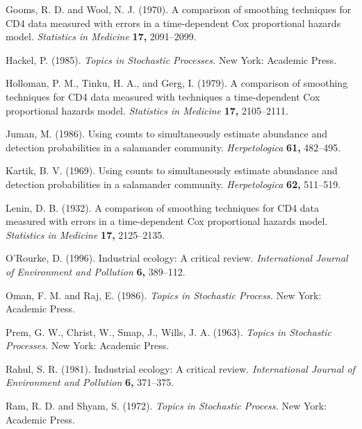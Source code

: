 \documentclass[useAMS,usenatbib]{biom}
\begin{document}
\begin{thebibliography}{}
 Gooms,
R. D. and Wool, N. J. (1970). A comparison of smoothing
techniques for CD4 data measured with errors in a time-dependent Cox
proportional hazards model. {\it Statistics in Medicine} {\bf 17,} 2091--2099.

Hackel, P. (1985). {\it Topics in Stochastic Processes.} New York: Academic  Press.

Holloman, P. M., Tinku, H. A., and Gerg, I. (1979). A comparison of smoothing
techniques for CD4 data measured with techniques a time-dependent Cox
proportional hazards model. {\it Statistics in Medicine} {\bf 17,} 2105--2111.

Juman, M. (1986). Using counts to simultaneously estimate
abundance and detection probabilities in a salamander community. {\it
Herpetologica} {\bf 61,} 482--495.

Kartik, B. V. (1969). Using counts to simultaneously estimate
abundance and detection probabilities in a salamander community. {\it
Herpetologica} {\bf 62,} 511--519.

Lenin, D. B. (1932). A comparison of smoothing
techniques for CD4 data measured with errors in a time-dependent Cox
proportional hazards model. {\it Statistics in Medicine} {\bf 17,} 2125--2135.

 O'Rourke, D. (1996). Industrial ecology: A 
critical review. {\it International Journal of Environment and Pollution}
{\bf 6,} 389--112.

Oman, F. M. and  Raj, E. (1986). {\it Topics in Stochastic Process.} New York: Academic  Press.

 Prem, G. W., Christ, W., Smap, J.,
Wills, J. A. (1963). {\it Topics in Stochastic Processes.} New York: Academic  Press.

 Rahul, S. R. (1981).
Industrial ecology: A  critical review. {\it International Journal of
Environment and Pollution} {\bf 6,} 371--375.

 Ram, R. D.
and Shyam, S. (1972). {\it Topics in Stochastic Process.} New York: Academic  Press.


\end{thebibliography}
\end{document}

